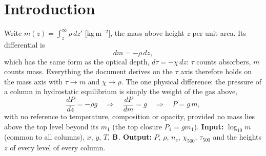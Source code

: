 


\begin{abstract}
\noindent Some inversions return the temperature and the magnetic field on surfaces of constant column mass $m$ (the mass per unit
area above a point) instead of constant optical depth. This mode computes, for every pixel column, the gas pressure, density,
electron density, the 500\,nm extinction and optical depth, and the geometric height of every surface. On a mass axis hydrostatic
equilibrium is exact and needs no opacity: $P=gm$. The heights follow from the density, the optical depth becomes an output, and
the columns are placed against each other as in the $\tau$-grid mode.
\end{abstract}

\section{Introduction}
Write $m(z)=\int_z^\infty\rho\,dz'$ [kg\,m$^{-2}$], the mass above height $z$ per unit area. Its differential is
\begin{equation}
dm=-\rho\,dz ,\label{eq:dm}
\end{equation}
which has the same form as the optical depth, $d\tau=-\chi\,dz$: $\tau$ counts absorbers, $m$ counts mass. Everything the
 document derives on the $\tau$ axis therefore holds on the mass axis with $\tau\to m$ and $\chi\to\rho$. The
one physical difference: the pressure of a column in hydrostatic equilibrium is simply the weight of the gas above,
\begin{equation}
\frac{dP}{dz}=-\rho g\quad\Longrightarrow\quad\frac{dP}{dm}=g\quad\Longrightarrow\quad P=g\,m ,\label{eq:pgm}
\end{equation}
with no reference to temperature, composition or opacity, provided no mass lies above the top level beyond its $m_1$ (the top
closure $P_1=gm_1$). \textbf{Input:} $\log_{10}m$ (common to all columns), $x$, $y$, $T$, $\mathbf B$. \textbf{Output:} $P$, $\rho$, $n_e$,
$\chi_{500}$, $\tau_{500}$ and the heights $z$ of every level of every column.

